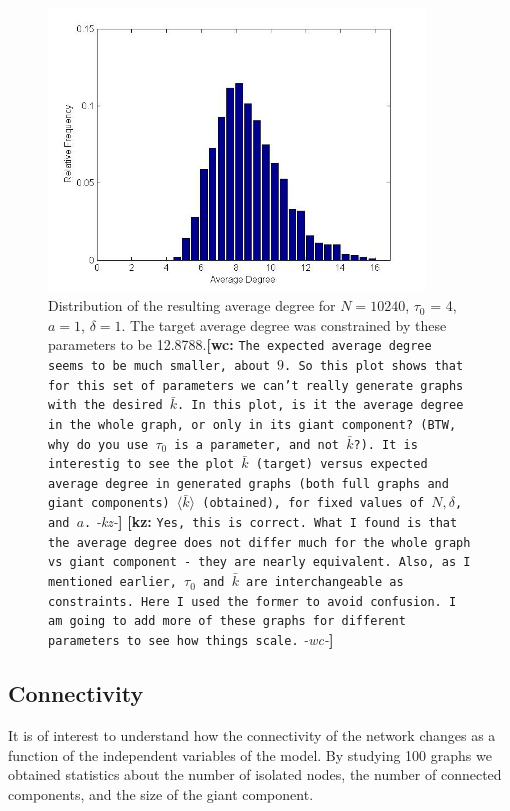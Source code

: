\documentclass[preprint,notitlepage,amsmath,amssymb,floatfix]{revtex4-1}
\newcommand{\XXX}[3]{{\bf [#1: } {\tt #3} {\it -#2-}{\bf ]}}
\begin{document}
\begin{figure}
\includegraphics[width=10cm]{figures/Average_Degree.jpg}
\caption{Distribution of the resulting average degree for $N = 10240$, $\tau_0$ = 4, $a = 1$, $\delta = 1$.  The target average degree was constrained by these parameters to be 12.8788.\XXX{wc}{kz}{The expected average degree seems to be much smaller, about $9$. So this plot shows that for this set of parameters we can't really generate graphs with the desired $\bar{k}$. In this plot, is it the average degree in the whole graph, or only in its giant component? (BTW, why do you use $\tau_0$ is a parameter, and not $\bar{k}$?). It is interestig to see the plot $\bar{k}$ (target) versus expected average degree in generated graphs (both full graphs and giant components) $\langle\bar{k}\rangle$ (obtained), for fixed values of $N, \delta$, and $a$.} \XXX{kz}{wc}{Yes, this is correct.  What I found is that the average degree does not differ much for the whole graph vs giant component - they are nearly equivalent.  Also, as I mentioned earlier, $\tau_0$ and $\bar{k}$ are interchangeable as constraints.  Here I used the former to avoid confusion.  I am going to add more of these graphs for different parameters to see how things scale.} }
\label{fig:avg_deg_uni}
\centering
\end{figure}

\subsection{Connectivity}
It is of interest to understand how the connectivity of the network changes as a function of the independent variables of the model.
By studying 100 graphs we obtained statistics about the number of isolated nodes, the number of connected components, and the size of the giant component.
\end{document}
